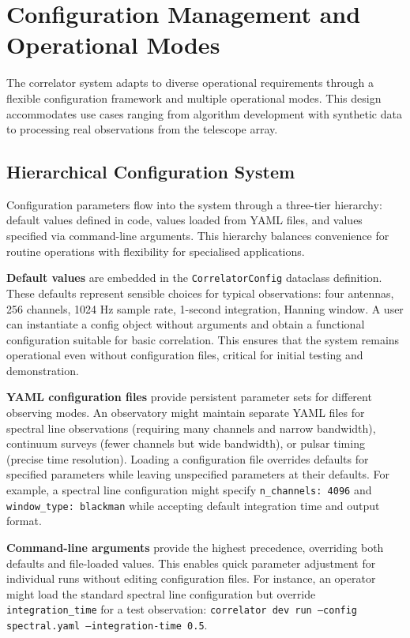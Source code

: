 \section{Configuration Management and Operational Modes}

The correlator system adapts to diverse operational requirements through a flexible configuration framework and multiple operational modes. This design accommodates use cases ranging from algorithm development with synthetic data to processing real observations from the telescope array.

\subsection{Hierarchical Configuration System}

Configuration parameters flow into the system through a three-tier hierarchy: default values defined in code, values loaded from YAML files, and values specified via command-line arguments. This hierarchy balances convenience for routine operations with flexibility for specialised applications.

\textbf{Default values} are embedded in the \texttt{CorrelatorConfig} dataclass definition. These defaults represent sensible choices for typical observations: four antennas, 256 channels, 1024 Hz sample rate, 1-second integration, Hanning window. A user can instantiate a config object without arguments and obtain a functional configuration suitable for basic correlation. This ensures that the system remains operational even without configuration files, critical for initial testing and demonstration.

\textbf{YAML configuration files} provide persistent parameter sets for different observing modes. An observatory might maintain separate YAML files for spectral line observations (requiring many channels and narrow bandwidth), continuum surveys (fewer channels but wide bandwidth), or pulsar timing (precise time resolution). Loading a configuration file overrides defaults for specified parameters while leaving unspecified parameters at their defaults. For example, a spectral line configuration might specify \texttt{n\_channels: 4096} and \texttt{window\_type: blackman} while accepting default integration time and output format.

\textbf{Command-line arguments} provide the highest precedence, overriding both defaults and file-loaded values. This enables quick parameter adjustment for individual runs without editing configuration files. For instance, an operator might load the standard spectral line configuration but override \texttt{integration\_time} for a test observation: \texttt{correlator dev run --config spectral.yaml --integration-time 0.5}.

